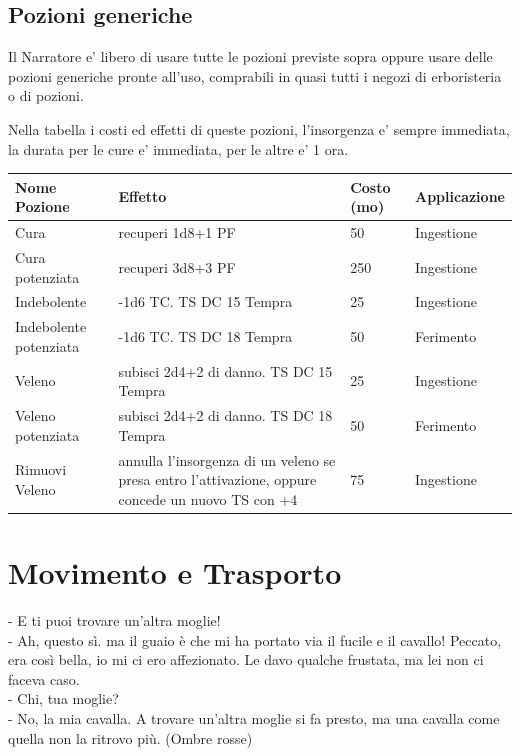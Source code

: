 \documentclass[a4paper,11pt,twoside,openany]{book}
\begin{document}
\subsection{Pozioni generiche}

Il Narratore e' libero di usare tutte le pozioni previste sopra oppure usare delle pozioni generiche pronte all'uso, comprabili in quasi tutti i negozi di erboristeria o di pozioni.

\medskip

Nella tabella i costi ed effetti di queste pozioni, l'insorgenza e' sempre immediata, la durata per le cure e' immediata, per le altre e' 1 ora.
\bigskip

\begin{tabularx}{\textwidth}{lXll}
	\textbf{Nome Pozione}&  \textbf{Effetto}&  \textbf{Costo (mo)}& \textbf{Applicazione}\\ 
	\toprule
	Cura& recuperi 1d8+1 PF & 50 & Ingestione\\ 
	Cura potenziata& recuperi 3d8+3 PF & 250  & Ingestione\\ 
	Indebolente& -1d6 TC. TS DC 15 Tempra & 25 &  Ingestione\\ 
	Indebolente potenziata& -1d6 TC. TS DC 18 Tempra&  50 & Ferimento \\ 
	Veleno& subisci 2d4+2 di danno. TS DC 15 Tempra & 25 & Ingestione \\ 
	Veleno potenziata& subisci 2d4+2 di danno. TS DC 18 Tempra & 50 & Ferimento \\ 
	Rimuovi Veleno & annulla l'insorgenza di un veleno se presa entro l'attivazione, oppure concede un nuovo TS con +4 & 75 & Ingestione\tabularnewline
\end{tabularx} 



\pagebreak

\section{Movimento e Trasporto}

\label{movimento-e-trasporto}



\begin{tcolorbox}[enhanced,arc=5pt,boxrule=0.3pt]{
		- E ti puoi trovare un'altra moglie!\\
		- Ah, questo sì. ma il guaio è che mi ha portato via il fucile e il cavallo! Peccato, era così bella, io mi ci ero affezionato. Le davo qualche frustata, ma lei non ci faceva caso.\\
		- Chi, tua moglie?\\
		- No, la mia cavalla. A trovare un'altra moglie si fa presto, ma una cavalla come quella non la ritrovo più. (Ombre rosse)}\end{tcolorbox}\medskip
\end{document}
